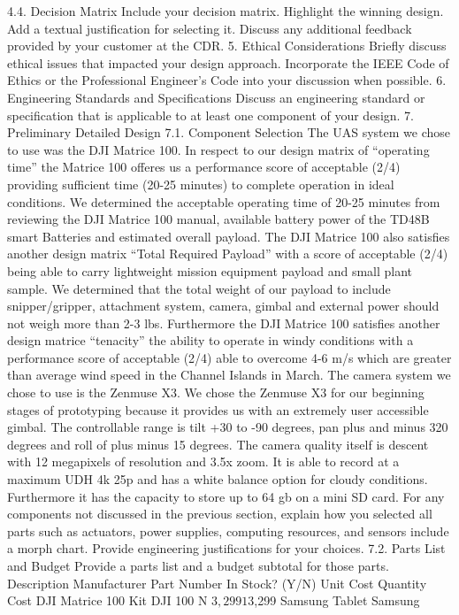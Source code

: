         4.4. Decision Matrix
Include your decision matrix.   Highlight the winning design.   Add a textual justification for selecting it.  
Discuss any additional feedback provided by your customer at the CDR.
    5. Ethical Considerations
Briefly discuss ethical issues that impacted your design approach.  Incorporate the IEEE Code of Ethics or the Professional Engineer’s Code into your discussion when possible. 
    6. Engineering Standards and Specifications
Discuss an engineering standard or specification that is applicable to at least one component of your design.
    7. Preliminary Detailed Design
        7.1. Component Selection
The UAS system we chose to use was the DJI Matrice 100. In respect to our design matrix of “operating time” the Matrice 100 offeres us a performance score of acceptable (2/4) providing sufficient time (20-25 minutes) to complete operation in ideal conditions.  We determined the acceptable operating time of 20-25 minutes from reviewing the DJI Matrice 100 manual, available battery power of the TD48B smart Batteries and estimated overall payload. The DJI Matrice 100 also satisfies another design matrix “Total Required Payload” with a score of acceptable (2/4) being able to carry lightweight mission equipment payload and small plant sample. We determined that the total weight of our payload to include snipper/gripper, attachment system, camera, gimbal and external power should not weigh more than 2-3 lbs. Furthermore the DJI Matrice 100 satisfies another design matrice “tenacity” the ability to operate in windy conditions with a performance score of acceptable (2/4) able to overcome 4-6 m/s which are greater than average wind speed in the Channel Islands in March.  The camera system we chose to use is the Zenmuse X3. We chose the Zenmuse X3 for our beginning stages of prototyping because it provides us with an extremely user accessible gimbal. The controllable range is tilt +30 to -90 degrees, pan plus and minus 320 degrees and roll of plus minus 15 degrees. The camera quality itself is descent with 12 megapixels of resolution and 3.5x zoom. It is able to record at a maximum UDH 4k 25p and has a white balance option for cloudy conditions. Furthermore it has the capacity to store up to 64 gb on a mini SD card. 
For any components not discussed in the previous section, explain how you selected all parts such as actuators, power supplies, computing resources, and sensors include a morph chart.  Provide engineering justifications for your choices.  
        7.2. Parts List and Budget
Provide a parts list and a budget subtotal for those parts. 
Description
Manufacturer
Part Number
In Stock? (Y/N)
Unit Cost
Quantity
Cost
DJI Matrice 100 Kit
DJI
100
N
$3,299
1
$3,299
Samsung Tablet
Samsung



